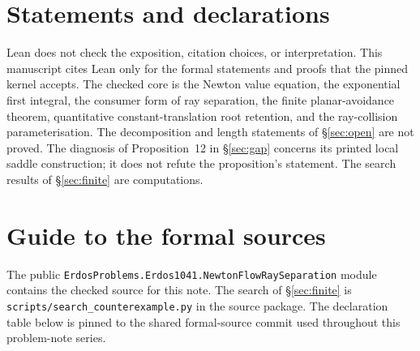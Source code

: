 \documentclass[11pt]{article}
\begin{document}
\section*{Statements and declarations}

Lean does not check the exposition, citation choices, or interpretation. This
manuscript cites Lean only for the formal statements and proofs that the pinned
kernel accepts. The checked
core is the Newton value equation, the exponential first integral, the consumer
form of ray separation, the finite planar-avoidance theorem, quantitative
constant-translation root retention, and the ray-collision parameterisation.  The
decomposition and length statements of \S\ref{sec:open} are not proved.  The
diagnosis of Proposition~12 in \S\ref{sec:gap} concerns its printed local
saddle construction; it does not refute the proposition's statement.  The
search results of \S\ref{sec:finite} are computations.

\appendix
\section{Guide to the formal sources}\label{app:sources}

The public \texttt{ErdosProblems.Erdos1041.NewtonFlowRaySeparation} module
contains the checked source for this note.  The search of \S\ref{sec:finite} is
\texttt{scripts/search\_counterexample.py} in the source package.  The
declaration table below is pinned to the shared formal-source commit used
throughout this problem-note series.
\end{document}
